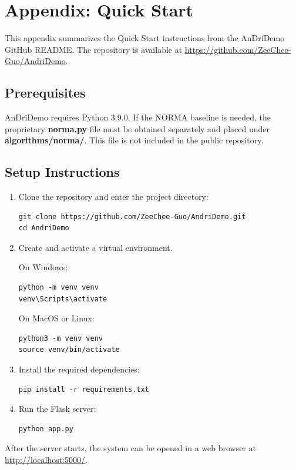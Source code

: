 \chapter{Appendix: Quick Start}
This appendix summarizes the Quick Start instructions from the AnDriDemo GitHub README. The repository is available at \url{https://github.com/ZeeChee-Guo/AndriDemo}.

\section{Prerequisites}

AnDriDemo requires Python 3.9.0. If the NORMA baseline is needed, the proprietary \textbf{norma.py} file must be obtained separately and placed under \textbf{algorithms/norma/}. This file is not included in the public repository.

\section{Setup Instructions}

\begin{enumerate}
    \item Clone the repository and enter the project directory:
\begin{verbatim}
git clone https://github.com/ZeeChee-Guo/AndriDemo.git
cd AndriDemo
\end{verbatim}

\item Create and activate a virtual environment.

On Windows:
\begin{verbatim}
python -m venv venv
venv\Scripts\activate
\end{verbatim}

On MacOS or Linux:
\begin{verbatim}
python3 -m venv venv
source venv/bin/activate
\end{verbatim}
\item Install the required dependencies:
\begin{verbatim}
pip install -r requirements.txt
\end{verbatim}
\item Run the Flask server:
\begin{verbatim}
python app.py
\end{verbatim}
\end{enumerate}

After the server starts, the system can be opened in a web browser at \url{http://localhost:5000/}.
